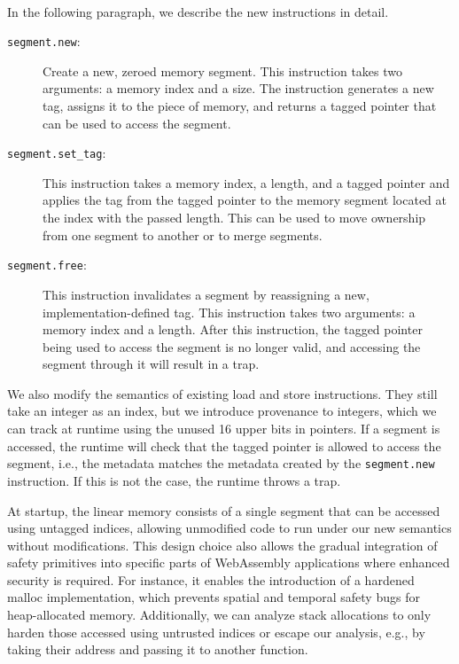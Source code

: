 \paragraph{}
In the following paragraph, we describe the new instructions in detail.

\begin{description}
    \item[\texttt{segment.new}:] Create a new, zeroed memory segment.
    This instruction takes two arguments: a memory index and a size.
    The instruction generates a new tag, assigns it to the piece of memory, and returns a tagged pointer that can be used to access the segment.
    \item[\texttt{segment.set\_tag}:] This instruction takes a memory index, a length, and a tagged pointer and applies the tag from the tagged pointer to the memory segment located at the index with the passed length.
    This can be used to move ownership from one segment to another or to merge segments.
    \item[\texttt{segment.free}:] This instruction invalidates a segment by reassigning a new, implementation-defined tag.
    This instruction takes two arguments: a memory index and a length.
    After this instruction, the tagged pointer being used to access the segment is no longer valid, and accessing the segment through it will result in a trap.
\end{description}

We also modify the semantics of existing load and store instructions.
They still take an integer as an index, but we introduce provenance to integers, which we can track at runtime using the unused 16 upper bits in pointers.
If a segment is accessed, the runtime will check that the tagged pointer is allowed to access the segment, i.e., the metadata matches the metadata created by the \texttt{segment.new} instruction.
If this is not the case, the runtime throws a trap.

At startup, the linear memory consists of a single segment that can be accessed using untagged indices, allowing unmodified code to run under our new semantics without modifications.
This design choice also allows the gradual integration of safety primitives into specific parts of WebAssembly applications where enhanced security is required.
For instance, it enables the introduction of a hardened malloc implementation, which prevents spatial and temporal safety bugs for heap-allocated memory.
Additionally, we can analyze stack allocations to only harden those accessed using untrusted indices or escape our analysis, e.g., by taking their address and passing it to another function.

